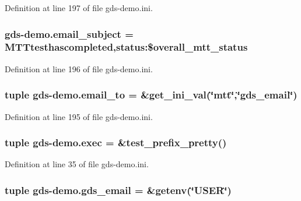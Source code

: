 Definition at line 197 of file gds-\/demo.\-ini.

\hypertarget{namespacegds-demo_a772ba8c6d51a7d3574b66d2dfd4194a5}{
\subsubsection[{email\-\_\-subject}]{\setlength{\rightskip}{0pt plus 5cm}gds-\/demo.\-email\-\_\-subject = M\-T\-Ttesthascompleted,status\-:\$overall\-\_\-mtt\-\_\-status}}\label{namespacegds-demo_a772ba8c6d51a7d3574b66d2dfd4194a5}


Definition at line 196 of file gds-\/demo.\-ini.

\hypertarget{namespacegds-demo_a758502074a250507a71dd1afdd3cf50c}{
\subsubsection[{email\-\_\-to}]{\setlength{\rightskip}{0pt plus 5cm}tuple gds-\/demo.\-email\-\_\-to = \&get\-\_\-ini\-\_\-val(\char`\"{}mtt\char`\"{},\char`\"{}{\bf gds\-\_\-email}\char`\"{})}}\label{namespacegds-demo_a758502074a250507a71dd1afdd3cf50c}


Definition at line 195 of file gds-\/demo.\-ini.

\hypertarget{namespacegds-demo_a860b0b1622e13aba647a797f1e3335cb}{
\subsubsection[{exec}]{\setlength{\rightskip}{0pt plus 5cm}tuple gds-\/demo.\-exec = \&test\-\_\-prefix\-\_\-pretty()}}\label{namespacegds-demo_a860b0b1622e13aba647a797f1e3335cb}


Definition at line 35 of file gds-\/demo.\-ini.

\hypertarget{namespacegds-demo_a46212fa747c3d30872b524a4c5c62084}{
\subsubsection[{gds\-\_\-email}]{\setlength{\rightskip}{0pt plus 5cm}tuple gds-\/demo.\-gds\-\_\-email = \&getenv(\char`\"{}U\-S\-E\-R\char`\"{})}}\label{namespacegds-demo_a46212fa747c3d30872b524a4c5c62084}


